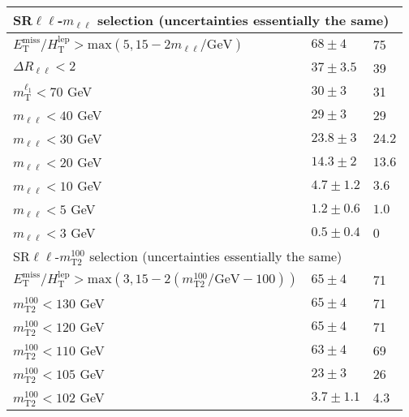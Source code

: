 \documentclass[12pt,fleqn]{article}
\begin{document}
\begin{table}[h!]
\begin{tabular}{l|p{3cm}|p{3cm}}
  \multicolumn{3}{l}{SR$\ell\ell$-$m_{\ell\ell}$ selection (uncertainties essentially the same)}\\ \midrule
  $E_\mathrm{T}^\mathrm{miss}/H_\mathrm{T}^\mathrm{lep} > \mathrm{max}(5,15-2 m_{\ell\ell}/\mathrm{GeV})$ & $68 \pm 4$ & 75 \\
  $\Delta R_{\ell\ell} < 2    $                                                   & $37\pm3.5$  & 39 \\
  $m_\mathrm{T}^{\ell_1} < 70$ GeV                                                & $30\pm3 $   & 31 \\
  $m_{\ell\ell}<40$ GeV                                                           & $29\pm3$    & 29 \\
  $m_{\ell\ell}<30$ GeV                                                           & $23.8\pm3$  & $24.2$ \\
  $m_{\ell\ell}<20$ GeV                                                           & $14.3\pm2$  & $13.6$ \\
  $m_{\ell\ell}<10$ GeV                                                           & $4.7\pm1.2$ & $3.6$ \\
  $m_{\ell\ell}<5 $ GeV                                                           & $1.2\pm0.6$ & $1.0$ \\
  $m_{\ell\ell}<3 $ GeV                                                           & $0.5\pm0.4$ & 0 \\ \midrule
  \multicolumn{3}{l}{SR$\ell\ell$-$m_\mathrm{T2}^{100}$ selection (uncertainties essentially the same)}\\ \midrule
  $E_\mathrm{T}^\mathrm{miss}/H_\mathrm{T}^\mathrm{lep} > \mathrm{max}(3,15-2 (m_\mathrm{T2}^{100}/\mathrm{GeV} - 100))$ & $65 \pm 4$ & 71 \\
  $m_\mathrm{T2}^{100} < 130$ GeV                                                 & $65\pm4$    & 71 \\
  $m_\mathrm{T2}^{100} < 120$ GeV                                                 & $65\pm4$    & 71 \\
  $m_\mathrm{T2}^{100} < 110$ GeV                                                 & $63\pm4$    & 69  \\
  $m_\mathrm{T2}^{100} < 105$ GeV                                                 & $23\pm3$    & 26 \\
  $m_\mathrm{T2}^{100} < 102$ GeV                                                 & $3.7\pm1.1$ & 4.3 \\ \bottomrule
 \end{tabular}
\end{table} 
 

 



 
\end{document}
